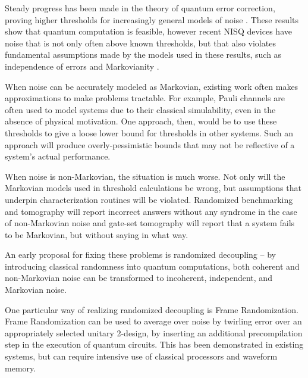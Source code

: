 \documentclass[aps,nofootinbib,pra,notitlepage,twocolumn]{revtex4-1}
\begin{document}
Steady progress has been made in the theory of quantum error correction, proving higher thresholds for increasingly general models of noise \cite{Aharonov2006, 1609.00510, https://doi.org/10.7907/z96m34sc, Kubica2018, Wang2003, Campbell2017}. These results show that quantum computation is feasible, however recent NISQ \cite{Preskill2018} devices have noise that is not only often above known thresholds, but that also violates fundamental assumptions made by the models used in these results\cite{Kelly2018, BlumeKohout2017, Klimov2018}, such as independence of errors\cite{Knill1998} and Markovianity \cite{Kitaev1997}.

When noise can be accurately modeled as Markovian, existing work often makes approximations to make problems tractable. For example, Pauli channels are often used to model systems due to their classical simulability\cite{quant-ph/9807006}, even in the absence of physical motivation\cite{Aliferis2007, Knill2005, Wang2011, DuclosCianci2010, Wootton2012, Bombin2012, Puzzuoli2014, aliferis2008accuracy}. One approach, then, would be to use these thresholds to give a loose lower bound for thresholds in other systems\cite{Puzzuoli2014}. Such an approach will produce overly-pessimistic bounds that may not be reflective of a system's actual performance.

When noise is non-Markovian, the situation is much worse. Not only will the Markovian models used in threshold calculations be wrong, but assumptions that underpin characterization routines will be violated. Randomized benchmarking and tomography will report incorrect answers without any syndrome in the case of non-Markovian noise \cite{Merkel2013} and gate-set tomography will report that a system fails to be Markovian, but without saying in what way.

An early proposal for fixing these problems is randomized decoupling\cite{Viola2005, Viola} -- by introducing classical randomness into quantum computations, both coherent and non-Markovian noise can be transformed to incoherent, independent, and Markovian noise.

One particular way of realizing randomized decoupling is Frame Randomization\cite{Wallman2016, Ware2018}. Frame Randomization can be used to average over noise by twirling error over an appropriately selected unitary 2-design, by inserting an additional precompilation step in the execution of quantum circuits.\cite{roy2009unitary} This has been demonstrated in existing systems\cite{Ware2018}, but can require intensive use of classical processors and waveform memory.
\end{document}
